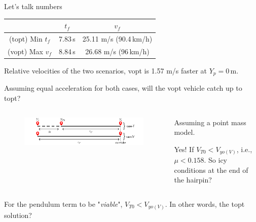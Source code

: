 \begin{frame}{Let's talk numbers}
    \begin{table}
        \centering
        \begin{tabular}{c|c|c}
            & $t_f$ & $v_f$\\
            \hline
            (topt) Min $t_f$ & 7.83\,s & 25.11 m/s (90.4\,km/h)\\
            (vopt) Max $v_f$ & 8.84\,s & 26.68 m/s (96\,km/h)\\
        \end{tabular}
    \end{table}
    \pause
    Relative velocities of the two scenarios, vopt is 1.57 m/s faster at $Y_p = 0$\,m.
    \pause

    Assuming equal acceleration for both cases, will the vopt vehicle catch up to topt? \pause
    \vfill
    \begin{columns}
        \begin{column}{0.7\textwidth}
            \begin{figure}
                \centering
                \includegraphics[width=\textwidth]{figures/pep1_analys.pdf}
            \end{figure} \pause
        \end{column}
        \begin{column}{0.3\textwidth}
            Assuming a point mass model.
            \begin{alertblock}{}
                Yes! If $V_{T0} < V_{yo(V)}$, i.e., $\mu < 0.158$. \newline
                So icy conditions at the end of the hairpin?
            \end{alertblock}
        \end{column}
    \end{columns}

\begin{exampleblock}{}
    For the pendulum term to be "\textit{viable}", $V_{T0} < V_{yo(V)}$. In other words, the topt solution?
\end{exampleblock}

\end{frame}